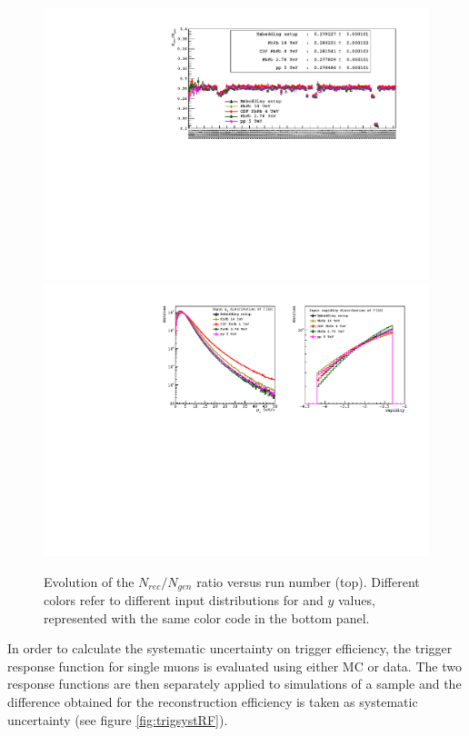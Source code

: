 \begin{figure}[!b]
\begin{center}
\includegraphics[width=\linewidth]{Chapters/Analysis/Figs/Axe/AxE_integrated.pdf}
\includegraphics[width=0.9\linewidth]{Chapters/Analysis/Figs/input_pt_rap_dist.pdf}
\caption{Evolution of the $N_{rec}/N_{gen}$ ratio versus run number (top). Different colors refer to different input distributions for \upsis \pt and $y$ values, represented with the same color code in the bottom panel.}
\label{fig:MCsyst}
\end{center}
\end{figure}

In order to calculate the systematic uncertainty on trigger efficiency, the trigger response function for single muons is evaluated using either MC or data.
The two response functions are then separately applied to simulations of a \upsi sample and the difference obtained for the \upsi reconstruction efficiency is taken as systematic uncertainty (see figure \ref{fig:trigsystRF}).


